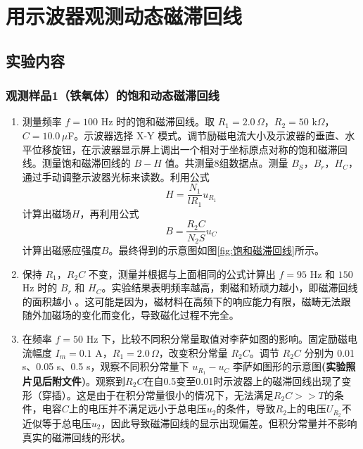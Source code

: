 \documentclass[zihao=5, UTF8]{article}
\theoremstyle{MyLineTheoremStyle} %
\theoremstyle{MyBlockTheoremStyle} %
\theoremstyle{MySubsubsectionStyle} %
\begin{document}
\section{用示波器观测动态磁滞回线}\thispagestyle{fancy} 

\subsection{实验内容}

\subsubsection{观测样品1（铁氧体）的饱和动态磁滞回线}
\begin{enumerate}
  \item 测量频率 $f = 100$ Hz 时的饱和磁滞回线。取 $R_1 = 2.0 \, \Omega$，$R_2 = 50$ k$\Omega$，$C = 10.0 \, \mu$F。示波器选择 X-Y 模式。调节励磁电流大小及示波器的垂直、水平位移旋钮，在示波器显示屏上调出一个相对于坐标原点对称的饱和磁滞回线。测量饱和磁滞回线的 $B-H$ 值。共测量8组数据点。测量 $B_S$，$B_r$，$H_C$，通过手动调整示波器光标来读数。利用公式$$H=\frac{N_1}{lR_1}u_{R_1}$$计算出磁场$H$，再利用公式$$B=\frac{R_2C}{N_2S}u_C$$计算出磁感应强度$B$。最终得到的示意图如图\ref{fig:饱和磁滞回线}所示。
    \item 保持 $R_1$，$R_2C$ 不变，测量并根据与上面相同的公式计算出 $f = 95$ Hz 和 $150$ Hz 时的 $B_r$ 和 $H_C$。实验结果表明频率越高，剩磁和矫顽力越小，即磁滞回线的面积越小
      。这可能是因为，磁材料在高频下的响应能力有限，磁畴无法跟随外加磁场的变化而变化，导致磁化过程不完全。    \item 在频率 $f = 50$ Hz 下，比较不同积分常量取值对李萨如图的影响。固定励磁电流幅度 $I_m = 0.1$ A，$R_1 = 2.0 \, \Omega$，改变积分常量 $R_2C$。调节 $R_2C$ 分别为 0.01 s、0.05 s、0.5 s，观察不同积分常量下 $u_{R_1}-u_C$ 李萨如图形的示意图\textbf{(实验照片见后附文件)}。观察到$R_2C$在自0.5变至0.01时示波器上的磁滞回线出现了变形（穿插）。这是由于在积分常量很小的情况下，无法满足$R_2C>>T$的条件，电容$C$上的电压并不满足远小于总电压$u_2$的条件，导致$R_2$上的电压$U_{R_2}$不近似等于总电压$u_2$，因此导致磁滞回线的显示出现偏差。但积分常量并不影响真实的磁滞回线的形状。
\end{enumerate}
\end{document}
